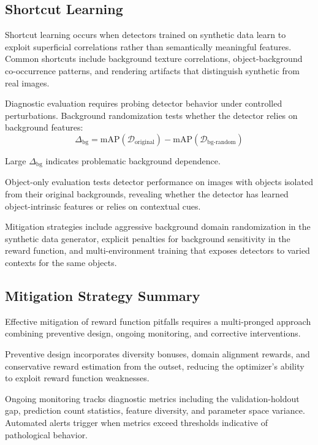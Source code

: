 \subsection{Shortcut Learning}

Shortcut learning occurs when detectors trained on synthetic data learn to exploit superficial correlations rather than semantically meaningful features. Common shortcuts include background texture correlations, object-background co-occurrence patterns, and rendering artifacts that distinguish synthetic from real images.

Diagnostic evaluation requires probing detector behavior under controlled perturbations. Background randomization tests whether the detector relies on background features:
\begin{equation}
\Delta_{\text{bg}} = \text{mAP}(\mathcal{D}_{\text{original}}) - \text{mAP}(\mathcal{D}_{\text{bg-random}})
\label{eq:background_sensitivity}
\end{equation}

Large $\Delta_{\text{bg}}$ indicates problematic background dependence.

Object-only evaluation tests detector performance on images with objects isolated from their original backgrounds, revealing whether the detector has learned object-intrinsic features or relies on contextual cues.

Mitigation strategies include aggressive background domain randomization in the synthetic data generator, explicit penalties for background sensitivity in the reward function, and multi-environment training that exposes detectors to varied contexts for the same objects.

\subsection{Mitigation Strategy Summary}

Effective mitigation of reward function pitfalls requires a multi-pronged approach combining preventive design, ongoing monitoring, and corrective interventions.

Preventive design incorporates diversity bonuses, domain alignment rewards, and conservative reward estimation from the outset, reducing the optimizer's ability to exploit reward function weaknesses.

Ongoing monitoring tracks diagnostic metrics including the validation-holdout gap, prediction count statistics, feature diversity, and parameter space variance. Automated alerts trigger when metrics exceed thresholds indicative of pathological behavior.

